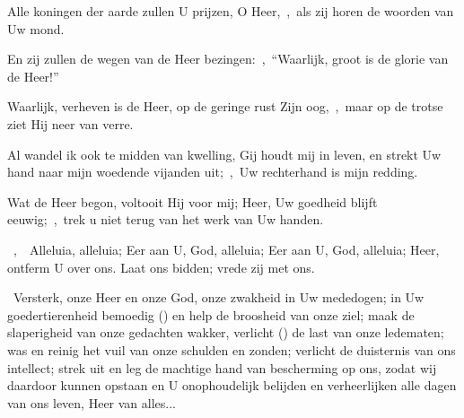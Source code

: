 \documentclass[12pt,twoside,a5paper]{article}
\begin{document}
\begin{halfparskip}
  Alle koningen der aarde zullen U prijzen, O Heer,~\sep\ als zij horen de woorden van Uw mond.

  En zij zullen de wegen van de Heer bezingen:~\sep\ ``Waarlijk, groot is de glorie van de Heer!''

  Waarlijk, verheven is de Heer, op de geringe rust Zijn oog,~\sep\ maar op de trotse ziet Hij neer van verre.

  Al wandel ik ook te midden van kwelling, Gij houdt mij in leven, en strekt Uw hand naar mijn woedende vijanden uit;~\sep\ Uw rechterhand is mijn redding.

  Wat de Heer begon, voltooit Hij voor mij; Heer, Uw goedheid blijft eeuwig;~\sep\ trek u niet terug van het werk van Uw handen.
\end{halfparskip}

\begin{halfparskip}
  ~\sep\ \dd~Alleluia, alleluia; Eer aan U, God, alleluia; Eer aan U, God, alleluia; Heer, ontferm U over ons. Laat ons bidden; vrede zij met ons.

  \cc~Versterk, onze Heer en onze God, onze zwakheid in Uw mededogen; in Uw goedertierenheid bemoedig
  () en help de broosheid van onze ziel; maak de slaperigheid van onze gedachten wakker, verlicht () de last van onze ledematen; was en reinig het vuil van onze schulden en zonden; verlicht de duisternis van ons intellect; strek uit en leg de machtige hand van bescherming op ons, zodat wij daardoor kunnen opstaan en U onophoudelijk belijden en verheerlijken alle dagen van ons leven, Heer van alles...
\end{halfparskip}



\end{document}
